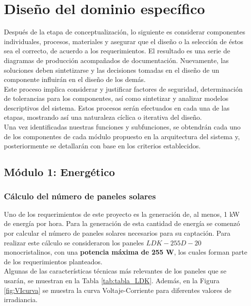 
\section{Diseño del dominio específico}
Después de la etapa de conceptualización, lo siguiente es considerar componentes individuales, procesos, materiales y asegurar que el diseño o la selección de éstos sea el correcto, de acuerdo a los requerimientos. El resultado es una serie de diagramas de producción acompañados de documentación. Nuevamente, las soluciones deben sintetizarse y las decisiones tomadas en el diseño de un componente influirán en el diseño de los demás. \\

Este proceso implica considerar y justificar factores de seguridad, determinación de tolerancias para los componentes, así como sintetizar y analizar modelos descriptivos del sistema. Estos procesos serán efectuados en cada una de las etapas, mostrando así una naturaleza cíclica o iterativa del diseño. \\

Una vez identificadas nuestras funciones y subfunciones, se obtendrán cada uno de los componentes de cada módulo propuesto en la arquitectura del sistema y, posteriormente se detallarán con base en los criterios establecidos.


\subsection{Módulo 1: Energético}

\subsubsection{Cálculo del número de paneles solares}
Uno de los requerimientos de este proyecto es la generación de, al menos, 1 kW de energía por hora. Para la generación de esta cantidad de energía se comenzó por calcular el número de paneles solares necesarios para su captación. Para realizar este cálculo se consideraron los paneles $ LDK-255D-20 $ monocristalinos, con una \textbf{potencia máxima de 255 W}, los cuales forman parte de los requerimientos planteados.\\

Algunas de las características técnicas más relevantes de los paneles que se usarán, se muestran en la Tabla \ref{tab:tabla_LDK}. Además, en la Figura \ref{fig:VIcurva} se muestra la curva Voltaje-Corriente para diferentes valores de irradiancia.\\

